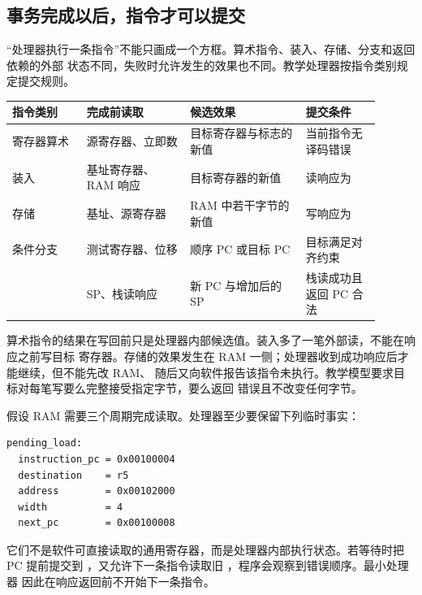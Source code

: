
\subsection{事务完成以后，指令才可以提交}

“处理器执行一条指令”不能只画成一个方框。算术指令、装入、存储、分支和返回依赖的外部
状态不同，失败时允许发生的效果也不同。教学处理器按指令类别规定提交规则。

\begin{longtable}{|L{0.18\linewidth}|L{0.25\linewidth}|L{0.29\linewidth}|L{0.18\linewidth}|}
\hline
{}
指令类别 & 完成前读取 & 候选效果 & 提交条件 \\ \hline
寄存器算术 & 源寄存器、立即数 & 目标寄存器与标志的新值 & 当前指令无译码错误 \\ \hline
装入 & 基址寄存器、RAM 响应 & 目标寄存器的新值 & 读响应为  \\ \hline
存储 & 基址、源寄存器 & RAM 中若干字节的新值 & 写响应为  \\ \hline
条件分支 & 测试寄存器、位移 & 顺序 PC 或目标 PC & 目标满足对齐约束 \\ \hline
{} & SP、栈读响应 & 新 PC 与增加后的 SP & 栈读成功且返回 PC 合法 \\ \hline
\end{longtable}

算术指令的结果在写回前只是处理器内部候选值。装入多了一笔外部读，不能在响应之前写目标
寄存器。存储的效果发生在 RAM 一侧；处理器收到成功响应后才能继续，但不能先改 RAM、
随后又向软件报告该指令未执行。教学模型要求目标对每笔写要么完整接受指定字节，要么返回
错误且不改变任何字节。


假设 RAM 需要三个周期完成读取。处理器至少要保留下列临时事实：

\begin{lstlisting}
pending_load:
  instruction_pc = 0x00100004
  destination    = r5
  address        = 0x00102000
  width          = 4
  next_pc        = 0x00100008
\end{lstlisting}

它们不是软件可直接读取的通用寄存器，而是处理器内部执行状态。若等待时把 PC 提前提交到
，又允许下一条指令读取旧 ，程序会观察到错误顺序。最小处理器
因此在响应返回前不开始下一条指令。

